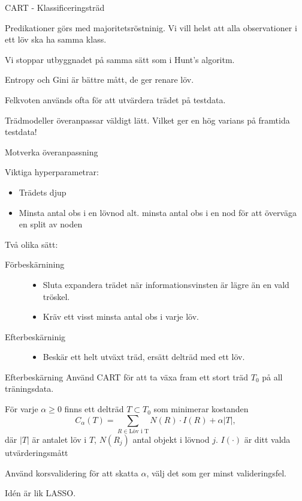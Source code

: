 \documentclass[10pt,english]{beamer}
\begin{document}
\begin{frame}{CART - Klassificeringsträd}

    Predikationer görs med majoritetsröstninig. Vi vill helst att alla observationer i ett löv ska ha samma klass.

    Vi stoppar utbyggnadet på samma sätt som i Hunt's algoritm.

    Entropy och Gini är bättre mått, de ger renare löv.

    Felkvoten används ofta för att utvärdera trädet på testdata.

    Trädmodeller överanpassar väldigt lätt. Vilket ger en hög varians på framtida testdata!
    
\end{frame}



\begin{frame}{Motverka överanpassning}

    Viktiga hyperparametrar:
    \begin{itemize}
      \item Trädets djup
      \item Minsta antal obs i en lövnod alt. minsta antal obs i en nod för att överväga en split av noden
    \end{itemize}

    Två olika sätt:
    \begin{description}
        \item[Förbeskärnining]
        \begin{itemize}
            \item Sluta expandera trädet när informationsvinsten är lägre än en vald tröskel.
            \item Kräv ett visst minsta antal obs i varje löv.
        \end{itemize}
        \item[Efterbeskärninig]
        \begin{itemize}
            \item Beskär ett helt utväxt träd, ersätt delträd med ett löv.
        \end{itemize}
    \end{description}
    
\end{frame}



\begin{frame}{Efterbeskärning}
    Använd CART för att ta växa fram ett stort träd $T_0$ på all träningsdata.

    För varje $\alpha \geq 0$ finns ett delträd $T \subset T_0$ som minimerar kostanden
    \begin{equation*}
        C_{\alpha}(T) = \sum_{R \in \text{Löv i T}} N(R) \cdot I(R) + \alpha |T|,
    \end{equation*} 
    där $|T|$ är antalet löv i $T$, $N(R_j)$ antal objekt i lövnod $j$. $I(\cdot)$ 
    är ditt valda utvärderingsmått

    Använd korsvalidering för att skatta $\alpha$, välj det som ger minst valideringsfel.

    Idén är lik LASSO.
\end{frame}
\end{document}
